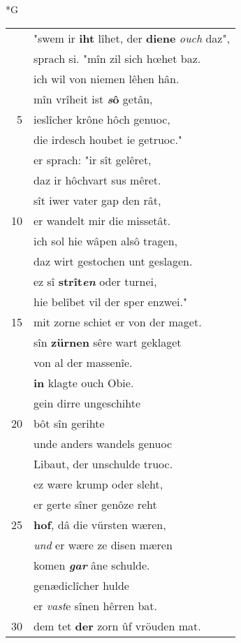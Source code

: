 \documentclass[8pt,a4paper,notitlepage]{article}
\begin{document}
\begin{table}[ht]
\begin{minipage}[t]{0.5\linewidth}
\small
\begin{center}*G
\end{center}
\begin{tabular}{rl}
 & "swem ir \textbf{iht} lîhet, der \textbf{diene} \textit{ouch} daz",\\ 
 & sprach si. "mîn zil sich hœhet baz.\\ 
 & ich wil von niemen lêhen hân.\\ 
 & mîn vrîheit ist \textbf{\textit{s}ô} getân,\\ 
5 & ieslîcher krône hôch genuoc,\\ 
 & die irdesch houbet ie getruoc."\\ 
 & er sprach: "ir sît gelêret,\\ 
 & daz ir hôchvart sus mêret.\\ 
 & sît iwer vater gap den rât,\\ 
10 & er wandelt mir die missetât.\\ 
 & ich sol hie wâpen alsô tragen,\\ 
 & daz wirt gestochen unt geslagen.\\ 
 & ez sî \textbf{strît\textit{en}} oder turnei,\\ 
 & hie belîbet vil der sper enzwei."\\ 
15 & mit zorne schiet er von der maget.\\ 
 & sîn \textbf{zürnen} sêre wart geklaget\\ 
 & von al der massenîe.\\ 
 & \textbf{in} klagte ouch Obie.\\ 
 & gein dirre ungeschihte\\ 
20 & bôt sîn gerihte\\ 
 & unde anders wandels genuoc\\ 
 & Libaut, der unschulde truoc.\\ 
 & ez wære krump oder sleht,\\ 
 & er gerte sîner genôze reht\\ 
25 & \textbf{hof}, dâ die vürsten wæren,\\ 
 & \textit{und} er wære ze disen mæren\\ 
 & komen \textit{\textbf{gar}} âne schulde.\\ 
 & genædiclîcher hulde\\ 
 & er \textit{vast}e sînen hêrren bat.\\ 
30 & dem tet \textbf{der} zorn ûf vröuden mat.\\ 

\end{tabular}
\end{minipage}
\end{table}
\end{document}

